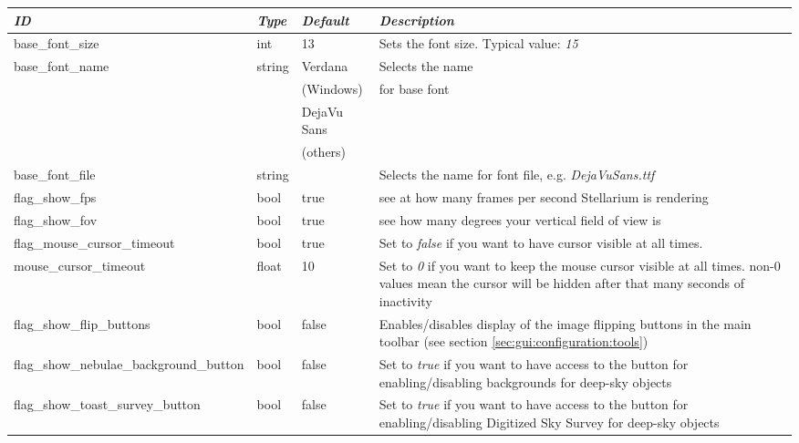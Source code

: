 \begin{longtabu} to \textwidth {l|l|l|X}
\toprule
\emph{ID} & \emph{Type} & \emph{Default} & \emph{Description}\\\midrule
base\_font\_size & int    & 13 & Sets the font size. Typical value: \emph{15}\\\midrule
base\_font\_name & string & Verdana     & Selects the name \\
                 &        & (Windows)            & for base font\\
                 &        & DejaVu Sans & \\
                 &        & (others)            & \\\midrule
base\_font\_file                & string &      & Selects the name for font file, e.g. \emph{DejaVuSans.ttf}\\\midrule
flag\_show\_fps                 & bool   & true & see at how many frames per second Stellarium is rendering\\\midrule
flag\_show\_fov                 & bool   & true & see how many degrees your vertical field of view is\\\midrule
flag\_mouse\_cursor\_timeout    & bool  & true  & Set to \emph{false} if you want to have cursor visible at all times.\\\midrule
mouse\_cursor\_timeout          & float & 10    & Set to \emph{0} if you want to keep the mouse cursor visible at all times. 
                                                  non-0 values mean the cursor will be hidden after that many seconds of inactivity\\\midrule
flag\_show\_flip\_buttons       & bool  & false & Enables/disables display of the image flipping buttons in the main 
                                                  toolbar (see section \ref{sec:gui:configuration:tools})\\\midrule
flag\_show\_nebulae\_background\_button & bool & false & Set to \emph{true} if you want to have access to the 
                                                         button for enabling/disabling backgrounds for deep-sky objects\\\midrule
flag\_show\_toast\_survey\_button & bool & false & Set to \emph{true} if you want to have access to the button for enabling/disabling Digitized Sky Survey for deep-sky objects\\\midrule

\end{longtabu}
